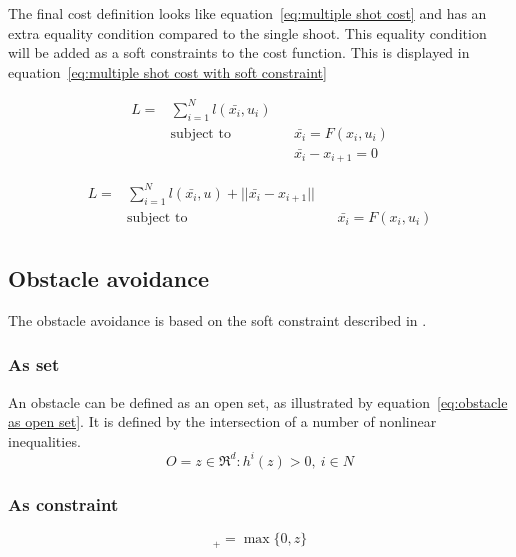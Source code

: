 			The final cost definition looks like equation~\ref{eq:multiple shot cost} and has an extra equality condition compared to the single shoot. This equality condition will be added as a soft constraints to the cost function. This is displayed in equation~\ref{eq:multiple shot cost with soft constraint}
			
			\begin{equation}
				\begin{aligned}
				L =  & \sum_{i=1}^{N} l(\bar{x_i},u_i) \\
				& \text{subject to}			&& \bar{x_i} = F(x_i,u_i) \\
				& 							&& \bar{x_i} - x_{i+1} = 0
				\end{aligned}
				\label{eq:multiple shot cost}
			\end{equation}
			
			\begin{equation}
			\begin{aligned}
			L =  & \sum_{i=1}^{N} l(\bar{x_i},u) + ||\bar{x_i} - x_{i+1}||\\
			& \text{subject to}			&& \bar{x_i} = F(x_i,u_i) \\
			\end{aligned}
			\label{eq:multiple shot cost with soft constraint}
			\end{equation}
			
		\subsection{Obstacle avoidance}
			The obstacle avoidance is based on the soft constraint described in \cite{AjaySathya2017}.
			\subsubsection{As set}
				An obstacle can be defined as an open set, as illustrated by equation~\ref{eq:obstacle as open set}. It is defined by the intersection of a number of nonlinear inequalities.
				\begin{equation}
					O = {z \in \Re^d : h^i(z)>0,\ i \in N}
					\label{eq:obstacle as open set}
				\end{equation}
				
			\subsubsection{As constraint}
				\begin{equation}
					[z]_+ =  \max\{0,z\}
				\end{equation}
				
